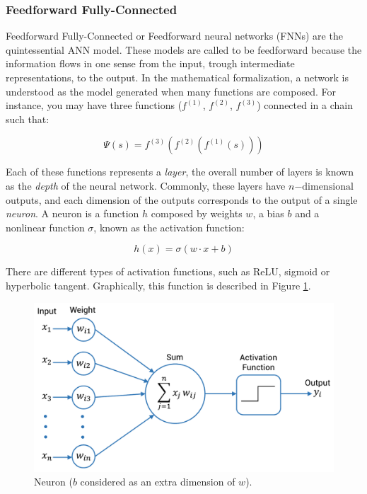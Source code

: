 \subsubsection{Feedforward Fully-Connected}
    
Feedforward Fully-Connected or Feedforward neural networks (FNNs) are the quintessential ANN model. These models are called to be feedforward because the information flows in one sense from the input, trough intermediate representations, to the output. In the mathematical formalization, a network is understood as the model generated when many functions are composed. For instance, you may have three functions ($f^{(1)}$, $f^{(2)}$, $f^{(3)}$) connected in a chain such that:

\begin{equation}
    \Psi(s) = f^{(3)}(f^{(2)}(f^{(1)}(s)))
\end{equation}

Each of these functions represents a \emph{layer}, the overall number of layers is known as the \emph{depth} of the neural network. Commonly, these layers have $n\mathrm{-dimensional}$ outputs, and each dimension of the outputs corresponds to the output of a single \emph{neuron}. A neuron is a function $h$ composed by weights $w$, a bias $b$ and a nonlinear function $\sigma$, known as the activation function:

\begin{equation}
    h(x) = \sigma(w \cdot x + b)
    \label{eq:h}
\end{equation}

There are different types of activation functions, such as ReLU, sigmoid or hyperbolic tangent. Graphically, this function is described in Figure \ref{fig:neuron}.

\begin{figure}[H]
    \centering
    \includegraphics[width=0.6\linewidth]{imagenes/cap1/neuron.pdf}
    \caption{Neuron ($b$ considered as an extra dimension of $w$).}
    \label{fig:neuron}
\end{figure}

